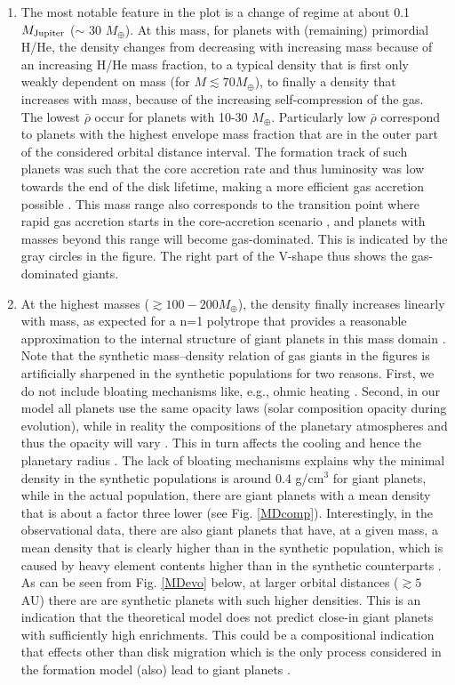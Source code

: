 \documentclass[]{emulateapj}
\def\mearth{M_{\oplus}}
\begin{document}
\begin{enumerate}
\item The most notable feature in the plot is a change of regime at about 0.1 $M_{\rm Jupiter}$ ($\sim$ 30 $M_{\oplus}$). At this mass, for planets with (remaining) primordial H/He, the density changes from decreasing with increasing mass because of an increasing H/He mass fraction, to a typical density that is first only weakly dependent on mass (for $M\lesssim 70 M_\oplus$), to finally a density that  increases with mass, because of the increasing self-compression of the gas. The lowest $\bar{\rho}$ {occur for} planets {with} 10-30 $M_{\oplus}$. {Particularly low $\bar{\rho}$ correspond to planets with the highest envelope mass fraction that are in the outer part of the considered orbital distance interval. The formation track of such planets was such that the core accretion rate and thus luminosity was low towards the end of the disk lifetime, making  a more efficient gas accretion possible \citep[e.g.,][]{Ikoma2000}. This} mass range {also} corresponds to the transition point where rapid gas accretion starts in the core-accretion scenario \citep{Pollack1996}, and planets with masses beyond this range will become gas-dominated. This is indicated by the gray circles in the figure.  The right part of the V-shape thus shows the gas-dominated giants.

\item At the highest masses ($\gtrsim100-200\mearth$), the density finally increases linearly with mass, as expected for a n=1 polytrope that provides a reasonable approximation to the internal structure of giant planets in this mass domain \citep{Baruteau2016}. Note that the synthetic mass--density relation of gas giants in the figures is artificially sharpened in the synthetic populations for two reasons. First, we do not include bloating mechanisms like, e.g., ohmic heating \citep{Batygin2011}. Second, in our model all planets use the same opacity laws (solar composition opacity during evolution), while in reality the compositions of the planetary atmospheres and thus the opacity will vary \citep[e.g.][]{Mordasini2016,Espinoza2016}. This in turn affects the cooling and hence the planetary radius \citep[e.g.,][]{Burrows2011,Vazan2013}. The lack of bloating mechanisms explains why the minimal density in the synthetic populations is around 0.4 g/cm$^3$ for giant planets, while in the actual population, there are giant planets with a mean density that is about a factor three lower (see Fig. \ref{MDcomp}). Interestingly, in the observational data, there are also giant planets that have, at a given mass, a mean density that is clearly higher than in the synthetic population, which is caused by heavy element contents higher than in the synthetic counterparts \citep[e.g.,][]{Leconte2011}. As can be seen from Fig. \ref{MDevo} below, at larger orbital distances  ($\gtrsim5$ AU) there are are synthetic planets with such higher densities. This is an indication that the theoretical model does not predict close-in giant planets with sufficiently high enrichments. This could be a compositional indication that effects other than disk migration which is the only process considered in the formation model (also) lead to giant planets \citep[e.g.,][]{Crida2014}.


\end{enumerate}
\end{document}
